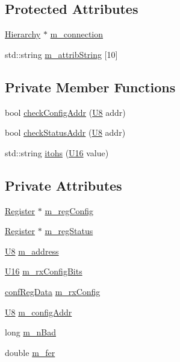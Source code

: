 \subsection*{Protected Attributes}
\begin{DoxyCompactItemize}
\item 
\hyperlink{classHierarchy}{Hierarchy} $\ast$ \hyperlink{classElement_abe3de7a5dbbc9a6dd2d7e012e5fdb266}{m\+\_\+connection}
\item 
std\+::string \hyperlink{classAttrib_a3414521d7a82476e874b25a5407b5e63}{m\+\_\+attrib\+String} \mbox{[}10\mbox{]}
\end{DoxyCompactItemize}
\subsection*{Private Member Functions}
\begin{DoxyCompactItemize}
\item 
bool \hyperlink{classLSDelayChipV1_aa8118972150a9e1e95e9006e003c0206}{check\+Config\+Addr} (\hyperlink{ICECALv3_8h_a3cb25ca6f51f003950f9625ff05536fc}{U8} addr)
\item 
bool \hyperlink{classLSDelayChipV1_a5083f29a93d38258d9de00dd5a89af99}{check\+Status\+Addr} (\hyperlink{ICECALv3_8h_a3cb25ca6f51f003950f9625ff05536fc}{U8} addr)
\item 
std\+::string \hyperlink{classLSDelayChipV1_af7f4d72fb404b6b3d7b41fd01876ed0a}{itohs} (\hyperlink{ICECALv3_8h_adf928e51a60dba0df29d615401cc55a8}{U16} value)
\end{DoxyCompactItemize}
\subsection*{Private Attributes}
\begin{DoxyCompactItemize}
\item 
\hyperlink{classRegister}{Register} $\ast$ \hyperlink{classLSDelayChipV1_afd1cfdcb114549dc1466c77f07d39fe0}{m\+\_\+reg\+Config}
\item 
\hyperlink{classRegister}{Register} $\ast$ \hyperlink{classLSDelayChipV1_aaf118f103e89a35d2c449e8e3ffe8c20}{m\+\_\+reg\+Status}
\item 
\hyperlink{ICECALv3_8h_a3cb25ca6f51f003950f9625ff05536fc}{U8} \hyperlink{classLSDelayChipV1_a6fba278fd2ac602c796b5e5cebf2d2de}{m\+\_\+address}
\item 
\hyperlink{ICECALv3_8h_adf928e51a60dba0df29d615401cc55a8}{U16} \hyperlink{classLSDelayChipV1_ae049797212539b231b9722ae69a0491d}{m\+\_\+rx\+Config\+Bits}
\item 
\hyperlink{structconfRegData}{conf\+Reg\+Data} \hyperlink{classLSDelayChipV1_a4818ac5c0d7ccf2845a01226234bdb67}{m\+\_\+rx\+Config}
\item 
\hyperlink{ICECALv3_8h_a3cb25ca6f51f003950f9625ff05536fc}{U8} \hyperlink{classLSDelayChipV1_ab49ac38bf9e7a41ccb89c6725cfcac3a}{m\+\_\+config\+Addr}
\item 
long \hyperlink{classLSDelayChipV1_a425c69ef8f3d64d93cb1c86b83bbceec}{m\+\_\+n\+Bad}
\item 
double \hyperlink{classLSDelayChipV1_a38d35de6a25fb1394ede2f39a4f25a08}{m\+\_\+fer}
\end{DoxyCompactItemize}


